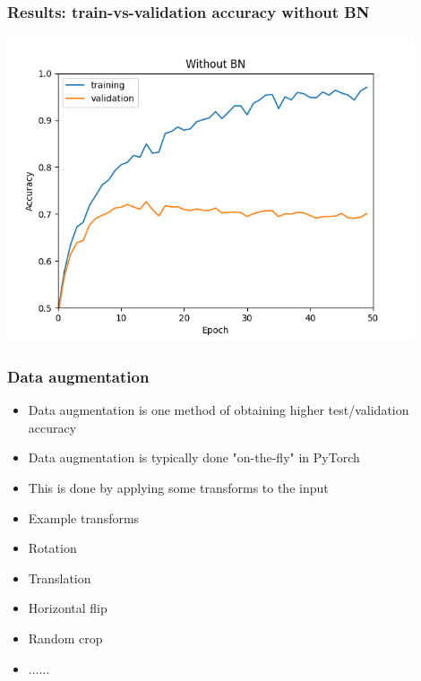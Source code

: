\documentclass{beamer}
\begin{document}
\begin{frame}
    \frametitle{Results: train-vs-validation accuracy without BN}
    \begin{center}
        \includegraphics[width=0.9\textwidth]{figs/accuracy-t-vs-v-woBN.png}
    \end{center}
\end{frame}
\begin{frame}
    \frametitle{Data augmentation}
    \begin{itemize}
        \item Data augmentation is one method of obtaining higher test/validation accuracy
        \item Data augmentation is typically done "on-the-fly" in PyTorch
        \item This is done by applying some transforms to the input
        \item Example transforms
        \item Rotation
        \item Translation
        \item Horizontal flip
        \item Random crop
        \item $\ldots\ldots$
    \end{itemize}
    

\end{frame}
\end{document}
